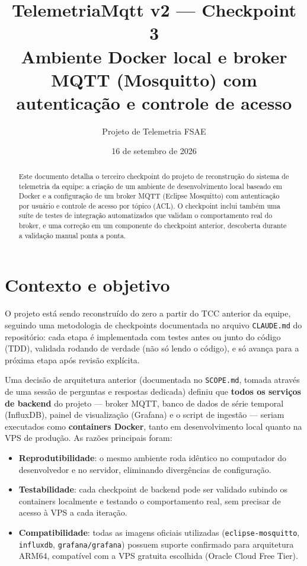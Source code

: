 \documentclass[11pt,a4paper]{article}
\title{\textbf{TelemetriaMqtt v2 --- Checkpoint 3} \\[4pt]
\large Ambiente Docker local e broker MQTT (Mosquitto) com autenticação e controle de acesso}
\author{Projeto de Telemetria FSAE}
\date{16 de setembro de 2026}
\begin{document}
\maketitle

\begin{abstract}
\noindent Este documento detalha o terceiro checkpoint do projeto de reconstrução do sistema de telemetria da equipe: a criação de um ambiente de desenvolvimento local baseado em Docker e a configuração de um broker MQTT (Eclipse Mosquitto) com autenticação por usuário e controle de acesso por tópico (ACL). O checkpoint inclui também uma suíte de testes de integração automatizados que validam o comportamento real do broker, e uma correção em um componente do checkpoint anterior, descoberta durante a validação manual ponta a ponta.
\end{abstract}

\tableofcontents

\section{Contexto e objetivo}

O projeto está sendo reconstruído do zero a partir do TCC anterior da equipe, seguindo uma metodologia de checkpoints documentada no arquivo \texttt{CLAUDE.md} do repositório: cada etapa é implementada com testes antes ou junto do código (TDD), validada rodando de verdade (não só lendo o código), e só avança para a próxima etapa após revisão explícita.

Uma decisão de arquitetura anterior (documentada no \texttt{SCOPE.md}, tomada através de uma sessão de perguntas e respostas dedicada) definiu que \textbf{todos os serviços de backend} do projeto --- broker MQTT, banco de dados de série temporal (InfluxDB), painel de visualização (Grafana) e o script de ingestão --- seriam executados como \textbf{containers Docker}, tanto em desenvolvimento local quanto na VPS de produção. As razões principais foram:

\begin{itemize}
    \item \textbf{Reprodutibilidade}: o mesmo ambiente roda idêntico no computador do desenvolvedor e no servidor, eliminando divergências de configuração.
    \item \textbf{Testabilidade}: cada checkpoint de backend pode ser validado subindo os containers localmente e testando o comportamento real, sem precisar de acesso à VPS a cada iteração.
    \item \textbf{Compatibilidade}: todas as imagens oficiais utilizadas (\texttt{eclipse-mosquitto}, \texttt{influxdb}, \texttt{grafana/grafana}) possuem suporte confirmado para arquitetura ARM64, compatível com a VPS gratuita escolhida (Oracle Cloud Free Tier).
\end{itemize}
\end{document}
